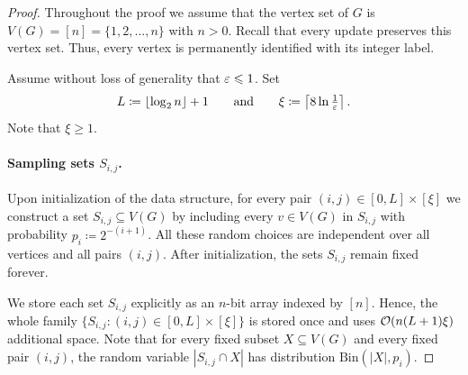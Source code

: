 \begin{proof}
Throughout the proof we assume that the vertex set of $G$ is $V(G)=[n]=\{1,2,\dots,n\}$ with $n>0$. Recall that every update preserves this vertex set.
Thus, every vertex is permanently identified with its integer label.

Assume without loss of generality that $\varepsilon\leqslant 1$. Set 
\[L\coloneqq \lfloor \log_2 n\rfloor + 1\qquad \textrm{and} \qquad\xi\coloneqq\left\lceil 8\ln\tfrac{1}{\varepsilon}\right\rceil.\]
Note that $\xi\ge 1$.




\paragraph*{Sampling sets $S_{i,j}$.} Upon initialization of the data structure, for every pair $(i,j)\in [0,L]\times [\xi]$ we construct a set $S_{i,j}\subseteq V(G)$ by including every $v\in V(G)$ in $S_{i,j}$ with probability $p_i\coloneqq 2^{-(i+1)}$.
All these random choices are independent over all vertices and all pairs $(i,j)$. After initialization, the sets $S_{i,j}$ remain fixed forever.

We store each set $S_{i,j}$ explicitly as an $n$-bit array indexed by $[n]$.
Hence, the whole family $\{S_{i,j}\colon (i,j)\in [0,L]\times [\xi]\}$ is stored once and uses $\mathcal{O}(n(L+1)\xi)$ additional space.
Note that for every fixed subset $X\subseteq V(G)$ and every fixed pair $(i,j)$, the random variable $|S_{i,j}\cap X|$ has distribution $\mathrm{Bin}(|X|,p_i)$.


\end{proof}
